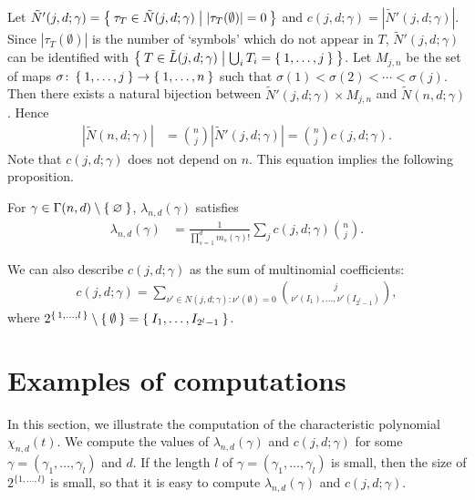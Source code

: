 \documentclass{wstmp}
\begin{document}
Let
$\tilde N'(j,d;\gamma)=\Set{\tau_T \in \tilde N(j,d;\gamma)|{\left|{\tau_T(\emptyset)}\right|}=0}$ and
$c(j,d;\gamma)
={\left|{\tilde N'(j,d;\gamma)}\right|}$.
Since ${\left|{\tau_T(\emptyset)}\right|}$
is the number of `symbols' which do not appear in $T$,
$\tilde N'(j,d;\gamma)$
can be identified with $\Set{ T \in \tilde L(j,d;\gamma)| \bigcup_{i} T_i =\Set{1,\ldots,j}}$.
Let $M_{j,n}$ be the set of maps $\sigma\colon \Set{1,\ldots,j} \to \Set{1,\ldots,n}$ 
such that $\sigma(1)<\sigma(2)<\cdots<\sigma(j)$.
Then there exists a natural bijection between 
$\tilde N'(j,d;\gamma) \times M_{j,n}$
and $\tilde N(n,d;\gamma)$.
Hence
\begin{align*}
{\left|{\tilde  N(n,d;\gamma)}\right|}&=\binom{n}{j}{\left|{\tilde N'(j,d;\gamma)}\right|}
=\binom{n}{j}c(j,d;\gamma).
\end{align*}
Note that $c(j,d;\gamma)$ does not depend on $n$.
This  equation implies the following proposition.
\begin{proposition}
\label{prop:number-type-modified}
For $\gamma\in\Gamma(n,d)\setminus\Set{\varnothing}$,
$\lambda_{n,d}(\gamma)$ satisfies 
\begin{align*}
\lambda_{n,d}(\gamma)
&
=\frac{1}{\prod_{s=1}^d m_s(\gamma) !}\sum_{j} c(j,d;\gamma) \binom{n}{j}.
\end{align*}
\end{proposition}
We can also describe $c(j,d;\gamma)$ as the sum of multinomial coefficients:
\begin{align*}
c(j,d;\gamma)
 =
\sum_{\nu' \in N(j,d;\gamma)\colon \nu'(\emptyset)=0} \binom{j}{\nu'(I_1),\ldots,\nu'(I_{2^l-1})},
\end{align*}
where 
$2^{\set{1,\ldots,l}}\setminus \Set{\emptyset}=\Set{I_1,\ldots,I_{2^l-1}}$.

\section{Examples of computations}
\label{sec:tables}

In this section, 
we illustrate the computation of the characteristic polynomial
$\chi_{n,d}(t)$.
We compute the values of $\lambda_{n,d}(\gamma)$ and $c(j,d;\gamma)$
for some $\gamma=(\gamma_1,\ldots,\gamma_l)$ and $d$.
If the length $l$ of
$\gamma=(\gamma_1,\ldots,\gamma_l)$ is small,
then the size of $2^{\{1,\ldots,l\}}$ is small,
so that it is easy to compute $\lambda_{n,d}(\gamma)$ and $c(j,d;\gamma)$.
\end{document}
